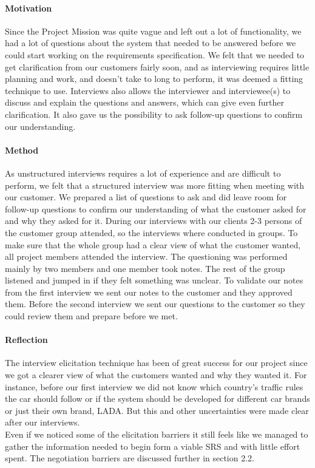 \documentclass[10pt]{article}
\begin{document}
\paragraph{Motivation}
\hfill \break
Since the Project Mission was quite vague and left out a lot of functionality, we had a lot of questions about the system that needed to be answered before we could start working on the requirements specification. We felt that we needed to get clarification from our customers fairly soon, and as interviewing requires little planning and work, and doesn't take to long to perform, it was deemed a fitting technique to use. Interviews also allows the interviewer and interviewee(s) to discuss and explain the questions and answers, which can give even further clarification. It also gave us the possibility to ask follow-up questions to confirm our understanding.

\paragraph{Method}
\hfill \break
As unstructured interviews requires a lot of experience and are difficult to perform, we felt that a structured interview was more fitting when meeting with our customer. We prepared a list of questions to ask and did leave room for follow-up questions to confirm our understanding of what the customer asked for and why they asked for it. During our interviews with our clients 2-3 persons of the customer group attended, so the interviews where conducted in groups. To make sure that the whole group had a clear view of what the customer wanted, all project members attended the interview. The questioning was performed mainly by two members and one member took notes. The rest of the group listened and jumped in if they felt something was unclear. To validate our notes from the first interview we sent our notes to the customer and they approved them. 
Before the second interview we sent our questions to the customer so they could review them and prepare before we met. 

\paragraph{Reflection}
\hfill \break
The interview elicitation technique has been of great success for our project since we got a clearer view of what the customers wanted and why they wanted it. For instance, before our first interview we did not know which country's traffic rules the car should follow or if the system should be developed for different car brands or just their own brand, LADA. But this and other uncertainties were made clear after our interviews. \\
\indent Even if we noticed some of the elicitation barriers it still feels like we managed to gather the information needed to begin form a viable SRS and with little effort spent. The negotiation barriers are discussed further in section 2.2. 
\end{document}

